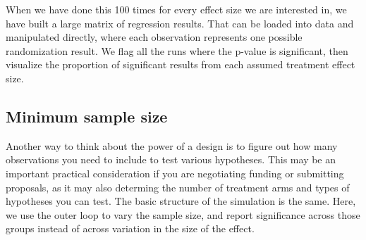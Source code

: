 When we have done this 100 times for every effect size we are interested in,
we have built a large matrix of regression results.
That can be loaded into data and manipulated directly,
where each observation represents one possible randomization result.
We flag all the runs where the p-value is significant,
then visualize the proportion of significant results
from each assumed treatment effect size.

{
}

\subsection{Minimum sample size}

Another way to think about the power of a design
is to figure out how many observations you need to include
to test various hypotheses.
This may be an important practical consideration
if you are negotiating funding or submitting proposals,
as it may also determing the number of treatment arms
and types of hypotheses you can test.
The basic structure of the simulation is the same.
Here, we use the outer loop to vary the sample size,
and report significance across those groups
instead of across variation in the size of the effect.

{
}


